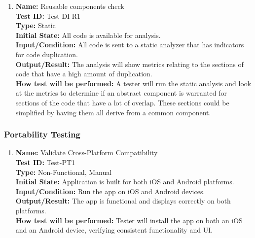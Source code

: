 \documentclass[12pt, titlepage]{article}
\begin{document}
\begin{enumerate}
\begin{enumerate}
    \item
    \textbf{Name:} Reusable components check \label{itm:Test-DI-R1} \\
    \textbf{Test ID:} Test-DI-R1 \\
    \textbf{Type:} Static \\
    \textbf{Initial State:} All code is available for analysis. \\
    \textbf{Input/Condition:} All code is sent to a static analyzer that has indicators for code duplication. \\
    \textbf{Output/Result:} The analysis will show metrics relating to the sections of code that have a high amount of duplication. \\
    \textbf{How test will be performed:} A tester will run the static analysis and look at the metrics to determine if an abstract component is warranted for sections of the code that have a lot of overlap. These sections could be simplified by having them all derive from a common component.

\end{enumerate}


\subsubsection{Portability Testing}

\begin{enumerate}

    \item \textbf{Name:} Validate Cross-Platform Compatibility \label{itm:Test-PT1} \\
    \textbf{Test ID:} Test-PT1 \\
    \textbf{Type:} Non-Functional, Manual \\
    \textbf{Initial State:} Application is built for both iOS and Android platforms. \\
    \textbf{Input/Condition:} Run the app on iOS and Android devices. \\
    \textbf{Output/Result:} The app is functional and displays correctly on both platforms. \\
    \textbf{How test will be performed:} Tester will install the app on both an iOS and an Android device, verifying consistent functionality and UI.


\end{enumerate}
\end{enumerate}
\end{document}
